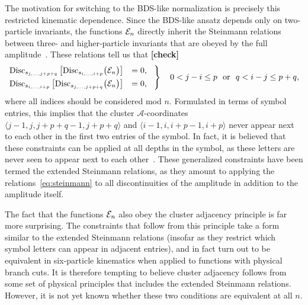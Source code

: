 \documentclass[11pt]{article}
\def\ket#1{\langle #1 \rangle}
\def\acoords{$\mathcal{A}$-coordinates}
\def\draftnote#1{{\bf [#1]}}
\begin{document}
The motivation for switching to the BDS-like normalization is precisely this restricted kinematic dependence. Since the BDS-like ansatz depends only on two-particle invariants, the functions ${\cal E}_n$ directly inherit the Steinmann relations between three- and higher-particle invariants that are obeyed by the full amplitude~\cite{Steinmann,Steinmann2,Cahill:1973qp,Caron-Huot:2016owq,Dixon:2016nkn}. These relations tell us that \draftnote{check}
\begin{equation} \label{eq:steinmann}
\begin{rcases}
\text{Disc}_{s_{j,\dots,j+p+q}}\left[\text{Disc}_{s_{i,\dots,i+p}} \big({\cal E}_n \big) \right] &= 0, \hspace{.3cm} \\
\text{Disc}_{s_{i,\dots,i+p}}\left[\text{Disc}_{s_{j,\dots,j+p+q}} \big({\cal E}_n \big) \right] &= 0, 
\end{rcases} \quad 
\begin{gathered} 0 < j-i \leq p \text{\ \ or\ \ } q < i-j  \leq p+q, \end{gathered}
\end{equation}
where all indices should be considered mod $n$. Formulated in terms of symbol entries, this implies that the cluster \acoords\ $\ket{j-1,j,j+p+q-1,j+p+q}$ and $\ket{i-1,i,i+p-1,i+p}$ never appear next to each other in the first two entries of the symbol. In fact, it is believed that these constraints can be applied at all depths in the symbol, as these letters are never seen to appear next to each other~\cite{Caron-Huot:2016owq,Dixon:2016nkn,Caron-Huot:2018dsv,cosmic_galois_paper,all_orders_adjacency}. These generalized constraints have been termed the extended Steinmann relations, as they amount to applying the relations~\eqref{eq:steinmann} to all discontinuities of the amplitude in addition to the amplitude itself. 

The fact that the functions ${\cal E}_n$ also obey the cluster adjacency principle is far more surprising. The constraints that follow from this principle take a form similar to the extended Steinmann relations (insofar as they restrict which symbol letters can appear in adjacent entries), and in fact turn out to be equivalent in six-particle kinematics when applied to functions with physical branch cuts. It is therefore tempting to believe cluster adjacency follows from some set of physical principles that includes the extended Steinmann relations. However, it is not yet known whether these two conditions are equivalent at all $n$. 
\end{document}
